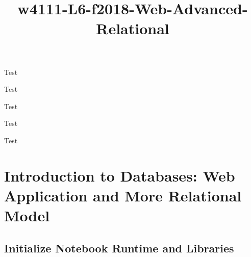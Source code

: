 \documentclass[11pt]{article}
\title{w4111-L6-f2018-Web-Advanced-Relational}
\begin{document}
    
    
    \maketitle
    
    

    
    Test

Test

Test

Test

Test

\section{Introduction to Databases: Web Application and More Relational
Model}\label{introduction-to-databases-web-application-and-more-relational-model}

    \subsection{Initialize Notebook Runtime and
Libraries}\label{initialize-notebook-runtime-and-libraries}
\end{document}
